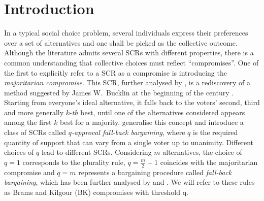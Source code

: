\begin{abstract}
	A social choice rule aggregates the preferences of a group of individuals over a set of alternatives into a collective choice. The literature admits several \acp{SCR} whose recommendations are supposed to reflect a compromise among individuals. We observe that all these compromise rules can be better described as \emph{procedural compromises}, i.e., they impose over individuals a willingness to compromise but they do not ensure an outcome where everyone has effectively compromised. We revisit the concept of a compromise in a collective choice environment with at least three individuals having strict preferences over a finite set of alternatives. Referring to a large class of spread measures, we view the concept of compromise from an \emph{equal loss} perspective, favoring an outcome where every voter concedes as equally as possible. As such, being a compromise may fail Pareto efficiency, which we ensure by asking voters to concede as equally as possible among the Pareto efficient alternatives. We show that Condorcet consistent rules, scoring rules and Brams-Kilgour compromises all fail to ascertain an outcome which is a compromise. This failure prevails for social choice problems with two individuals: all well-known two-person social choice rules of the literature, namely, fallback bargaining, Pareto and veto rules, short listing and veto rank, fail to pick ex-post compromises. 
\end{abstract}

\section{Introduction}
\label{sec:introduction}
In a typical social choice problem, several individuals express their preferences over a set of alternatives and one shall be picked as the collective outcome. Although the literature admits several \acp{SCR} with different properties, there is a common understanding that collective choices must reflect “compromises”. One of the first to explicitly refer to a \ac{SCR} as a compromise is \citet{Sertel1986} introducing the \emph{majoritarian compromise}. This \ac{SCR}, further analysed by \citet{Sertel1999}, is a rediscovery of a method suggested by James W.\ Bucklin at the beginning of the  century \citep{Erdelyi2015}. Starting from everyone’s ideal alternative, it falls back to the voters’ second, third and more generally $k$-\emph{th} best, until one of the alternatives considered appears among the first $k$ best for a majority. \citet{Brams2001} generalise this concept and introduce a class of \acp{SCR} called $q$\emph{-approval fall-back bargaining}, where $q$ is the required quantity of support that can vary from a single voter up to unanimity. Different choices of $q$ lead to different \acp{SCR}. Considering $m$ alternatives, the choice of $q=1$ corresponds to the plurality rule, $q=\frac{m}{2}+1$ coincides with the majoritarian compromise and $q=m$ represents a bargaining procedure called \emph{fall-back bargaining}, which has been further analysed by \citet{Kibris2007} and \citet{Congar2012}. We will refer to these rules as Brams and Kilgour (BK) compromises with threshold q.


